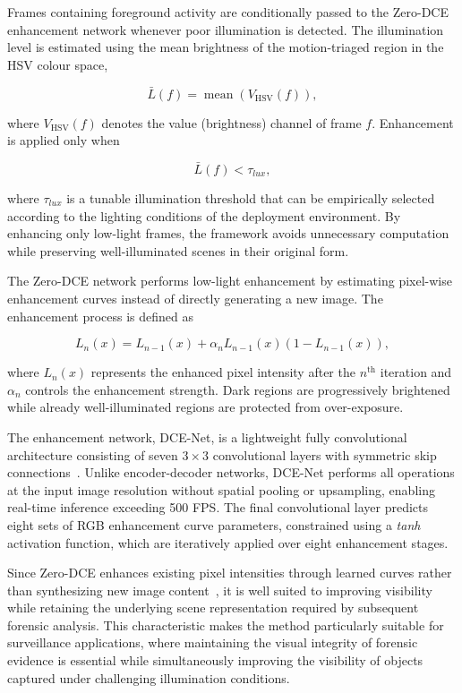 \documentclass[conference]{IEEEtran}
\begin{document}
Frames containing foreground activity are conditionally passed to the Zero-DCE enhancement network \cite{zerodce} whenever poor illumination is detected. The illumination level is estimated using the mean brightness of the motion-triaged region in the HSV colour space,

\begin{equation}
\bar{L}(f)=\operatorname{mean}\left(V_{\mathrm{HSV}}(f)\right),
\end{equation}

where $V_{\mathrm{HSV}}(f)$ denotes the value (brightness) channel of frame $f$. Enhancement is applied only when

\begin{equation}
\bar{L}(f)<\tau_{lux},
\end{equation}

where $\tau_{lux}$ is a tunable illumination threshold that can be empirically selected according to the lighting conditions of the deployment environment. By enhancing only low-light frames, the framework avoids unnecessary computation while preserving well-illuminated scenes in their original form.

The Zero-DCE network performs low-light enhancement by estimating pixel-wise enhancement curves instead of directly generating a new image. The enhancement process is defined as

\begin{equation}
L_n(x)=L_{n-1}(x)+\alpha_nL_{n-1}(x)\left(1-L_{n-1}(x)\right),
\end{equation}

where $L_n(x)$ represents the enhanced pixel intensity after the $n^{\text{th}}$ iteration and $\alpha_n$ controls the enhancement strength. Dark regions are progressively brightened while already well-illuminated regions are protected from over-exposure.

The enhancement network, DCE-Net, is a lightweight fully convolutional architecture consisting of seven $3\times3$ convolutional layers with symmetric skip connections~\cite{zerodce}. Unlike encoder-decoder networks, DCE-Net performs all operations at the input image resolution without spatial pooling or upsampling, enabling real-time inference exceeding 500 FPS. The final convolutional layer predicts eight sets of RGB enhancement curve parameters, constrained using a \textit{tanh} activation function, which are iteratively applied over eight enhancement stages.

Since Zero-DCE enhances existing pixel intensities through learned
curves rather than synthesizing new image content~\cite{zerodce}, it is
well suited to improving visibility while retaining the underlying
scene representation required by subsequent forensic analysis. This characteristic makes the method particularly suitable for surveillance applications, where maintaining the visual integrity of forensic evidence is essential while simultaneously improving the visibility of objects captured under challenging illumination conditions.
\end{document}

